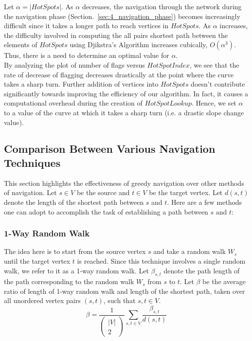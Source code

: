 \documentclass[10pt, conference, compsocconf]{IEEEtran}
\begin{document}
Let $\alpha = |HotSpots|$. As $\alpha$ decreases, the navigation through 
the network during the navigation phase (Section.~\ref{sec:4_navigation_phase}) becomes increasingly difficult since it takes a longer path to reach vertices in $HotSpots$. As $\alpha$ increases, the difficulty involved in computing the all pairs shortest path between the elements of $HotSpots$ using Djikstra's Algorithm increases cubically, $O(\alpha^3)$. Thus, there is a need to determine an optimal value for $\alpha$.\\

By analyzing the plot of number of flags versus $HotSpotIndex$, we see that the rate of decrease of flagging decreases drastically at the point where the curve takes a sharp turn. Further addition of vertices into $HotSpots$ doesn't contribute significantly towards improving the efficiency of our algorithm. In fact, it causes a computational overhead during the creation of $HotSpotLookup$. Hence, we set $\alpha$ to a value of the curve at which it takes a sharp turn (i.e. a drastic slope change value).\\

\subsection{Comparison Between Various Navigation Techniques}

This section highlights the effectiveness of greedy navigation over other methods of navigation. Let $s \in V$ be the source and $t \in V$ be the target vertex. 
Let $d(s,t)$ denote the length of the shortest path between $s$ and $t$. Here are a few methods one can adopt to accomplish the task of establishing a path between $s$ and $t$:\\

\subsubsection {1-Way Random Walk}
The idea here is to start from the source vertex $s$ and take a random walk  $W_s$ until the target vertex $t$ is reached. Since this technique involves  a single random walk, we refer to it as a 1-way random walk. Let $\beta_{s,t}$ denote the path length of the path corresponding to the random walk $W_s$ from $s$ to $t$. Let $\beta$ be the average ratio of length of 1-way random walk and length of the shortest path, taken over all unordered vertex pairs $(s,t)$, such that $s,t \in V$.$$\beta = \frac{1}{\left(\begin{array}{c} |V|\\ 2\end{array}\right)} \sum_{s,t \in V} 
\frac{\beta_{s,t}}{d(s,t)}$$
\end{document}
